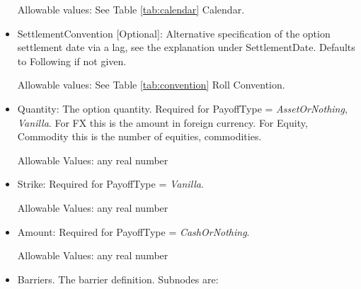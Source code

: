 \begin{itemize}
  Allowable values: See Table \ref{tab:calendar} Calendar.

\item SettlementConvention [Optional]: Alternative specification of the option settlement date via a lag, see the
  explanation under SettlementDate. Defaults to Following if not given.

Allowable values: See Table \ref{tab:convention} Roll Convention.

\item Quantity: The option quantity. Required for PayoffType = \emph{AssetOrNothing}, \emph{Vanilla}. For FX this is the amount in
  foreign currency. For Equity, Commodity this is the number of equities, commodities.

  Allowable Values: any real number

\item Strike: Required for PayoffType = \emph{Vanilla}.

  Allowable Values: any real number

\item Amount: Required for PayoffType = \emph{CashOrNothing}.

  Allowable Values: any real number

\item Barriers. The barrier definition. Subnodes are:


\end{itemize}
